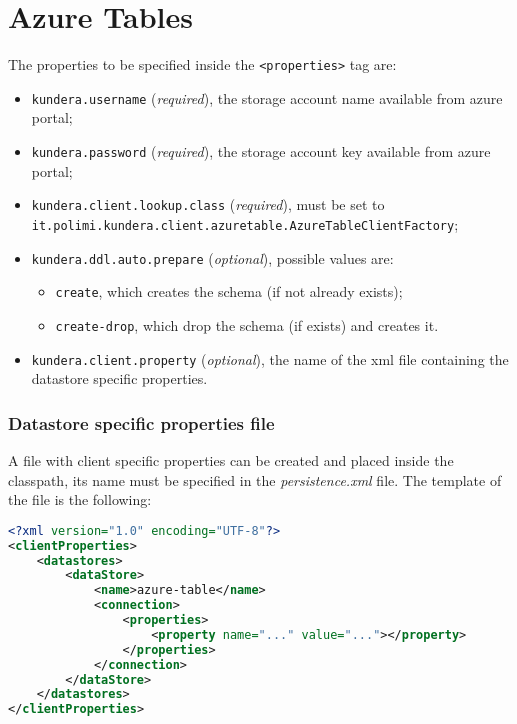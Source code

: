 \section{Azure Tables}
\label{appendix:table-config}
The properties to be specified inside the \texttt{<properties>} tag are:
\begin{itemize}
\item \texttt{kundera.username} (\textit{required}), the storage account name available from azure portal;
\item \texttt{kundera.password} (\textit{required}), the storage account key available from azure portal;
\item \texttt{kundera.client.lookup.class} (\textit{required}), must be set to\\\texttt{it.polimi.kundera.client.azuretable.AzureTableClientFactory};
\item \texttt{kundera.ddl.auto.prepare} (\textit{optional}), possible values are:
\begin{itemize}
\item \texttt{create}, which creates the schema (if not already exists);
\item \texttt{create-drop}, which drop the schema (if exists) and creates it.
\end{itemize}
\item \texttt{kundera.client.property} (\textit{optional}), the name of the xml file containing the datastore specific properties.
\end{itemize}

\subsubsection{Datastore specific properties file}
A file with client specific properties can be created and placed inside the classpath, its name must be specified in the \textit{persistence.xml} file.
The template of the file is the following:

\begin{lstlisting}[language=XML, caption=Azure Tables - datastore specific configuration]
<?xml version="1.0" encoding="UTF-8"?>
<clientProperties>
    <datastores>
        <dataStore>
            <name>azure-table</name>
            <connection>
                <properties>
                    <property name="..." value="..."></property>
                </properties>
            </connection>
        </dataStore>
    </datastores>
</clientProperties>
\end{lstlisting}

